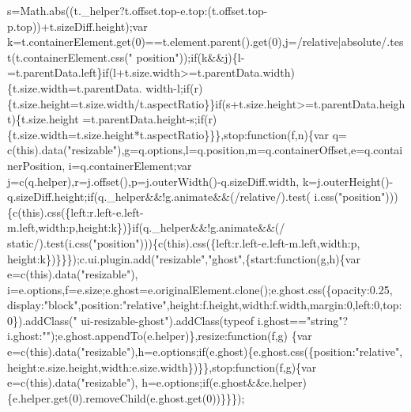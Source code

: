 \begin{DoxyCode}
      s=Math.abs((t.\_helper?t.offset.top-e.top:(t.offset.top-p.top))+t.sizeDiff.height);var 
      k=t.containerElement.get(0)==t.element.parent().get(0),j=/relative|absolute/.test(t.containerElement.css(\textcolor{stringliteral}{"
      position"}));\textcolor{keywordflow}{if}(k&&j)\{l-=t.parentData.left\}\textcolor{keywordflow}{if}(l+t.size.width>=t.parentData.width)\{t.size.width=t.parentData.
      width-l;\textcolor{keywordflow}{if}(r)\{t.size.height=t.size.width/t.aspectRatio\}\}\textcolor{keywordflow}{if}(s+t.size.height>=t.parentData.height)\{t.size.height
      =t.parentData.height-s;\textcolor{keywordflow}{if}(r)\{t.size.width=t.size.height*t.aspectRatio\}\}\},stop:\textcolor{keyword}{function}(f,n)\{var q=
      c(\textcolor{keyword}{this}).data(\textcolor{stringliteral}{"resizable"}),g=q.options,l=q.position,m=q.containerOffset,e=q.containerPosition,
      i=q.containerElement;var j=c(q.helper),r=j.offset(),p=j.outerWidth()-q.sizeDiff.width,
      k=j.outerHeight()-q.sizeDiff.height;\textcolor{keywordflow}{if}(q.\_helper&&!g.animate&&(/relative/).test(
      i.css(\textcolor{stringliteral}{"position"})))\{c(\textcolor{keyword}{this}).css(\{left:r.left-e.left-m.left,width:p,height:k\})\}\textcolor{keywordflow}{if}(q.\_helper&&!g.animate&&(/\textcolor{keyword}{
      static}/).test(i.css(\textcolor{stringliteral}{"position"})))\{c(\textcolor{keyword}{this}).css(\{left:r.left-e.left-m.left,width:p,
      height:k\})\}\}\});c.ui.plugin.add(\textcolor{stringliteral}{"resizable"},\textcolor{stringliteral}{"ghost"},\{start:\textcolor{keyword}{function}(g,h)\{var e=c(\textcolor{keyword}{this}).data(\textcolor{stringliteral}{"resizable"}),
      i=e.options,f=e.size;e.ghost=e.originalElement.clone();e.ghost.css(\{opacity:0.25,
      display:\textcolor{stringliteral}{"block"},position:\textcolor{stringliteral}{"relative"},height:f.height,width:f.width,margin:0,left:0,top:0\}).addClass(\textcolor{stringliteral}{"
      ui-resizable-ghost"}).addClass(typeof i.ghost==\textcolor{stringliteral}{"string"}?i.ghost:\textcolor{stringliteral}{""});e.ghost.appendTo(e.helper)\},resize:\textcolor{keyword}{function}(f,g)
      \{var e=c(\textcolor{keyword}{this}).data(\textcolor{stringliteral}{"resizable"}),h=e.options;\textcolor{keywordflow}{if}(e.ghost)\{e.ghost.css(\{position:\textcolor{stringliteral}{"relative"},
      height:e.size.height,width:e.size.width\})\}\},stop:\textcolor{keyword}{function}(f,g)\{var e=c(\textcolor{keyword}{this}).data(\textcolor{stringliteral}{"resizable"}),
      h=e.options;\textcolor{keywordflow}{if}(e.ghost&&e.helper)\{e.helper.get(0).removeChild(e.ghost.get(0))\}\}\});

\end{DoxyCode}

